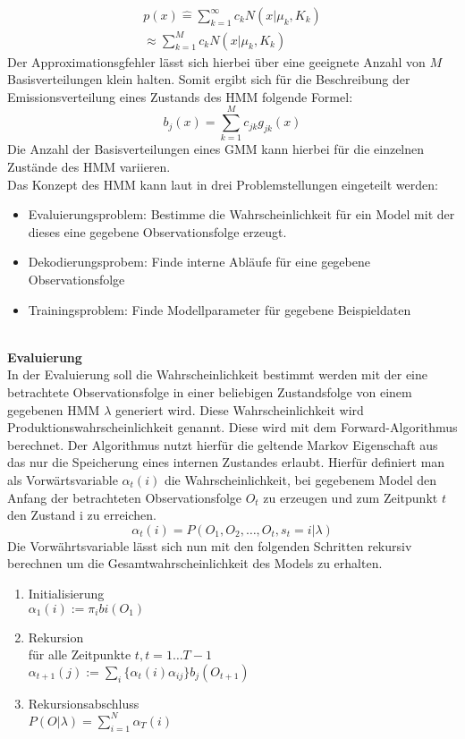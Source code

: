 \begin{multline}
p(x) \hat{=} \sum_{k=1}^\infty c_{k} N(x|\mu_{k},K_{k})\\
\approx \sum_{k=1}^M c_{k} N(x|\mu_{k},K_{k})  
\end{multline}
Der Approximationsgfehler lässt sich hierbei über eine geeignete Anzahl von
\(M\) Basisverteilungen klein halten. Somit ergibt sich für die Beschreibung der
Emissionsverteilung eines Zustands des \acl{HMM} folgende Formel:
\begin{equation}
b_{j}(x) = \sum_{k=1}^M c_{jk}g_{jk}(x)
\end{equation}
Die Anzahl der Basisverteilungen eines \acl{GMM} kann hierbei für die einzelnen
Zustände des HMM variieren.\\

Das Konzept des \acl{HMM} kann laut \cite{rabiner} in drei Problemstellungen eingeteilt werden:
\begin{itemize}
  \item Evaluierungsproblem: Bestimme die Wahrscheinlichkeit für ein Model mit
  der dieses eine gegebene Observationsfolge erzeugt.
  \item Dekodierungsprobem: Finde interne Abläufe für eine gegebene Observationsfolge
  \item Trainingsproblem: Finde Modellparameter für gegebene Beispieldaten
\end{itemize}
\\
\textbf{Evaluierung} \\
In der Evaluierung soll die Wahrscheinlichkeit bestimmt werden mit der eine
betrachtete Observationsfolge in einer beliebigen Zustandsfolge von einem
gegebenen \acl{HMM} \(\lambda\) generiert wird. Diese Wahrscheinlichkeit wird
Produktionswahrscheinlichkeit genannt. Diese wird mit dem Forward-Algorithmus
berechnet. Der Algorithmus nutzt hierfür die geltende Markov Eigenschaft
aus das nur die Speicherung eines internen Zustandes erlaubt. Hierfür definiert
man als Vorwärtsvariable \(\alpha_{t}(i)\) die Wahrscheinlichkeit, bei
gegebenem Model \lampda den Anfang der betrachteten Observationsfolge \(O_{t}\)
zu erzeugen und zum Zeitpunkt \(t\) den Zustand i zu erreichen.
\begin{equation}
\alpha_{t}(i) = P(O_{1},O_{2},\ldots,O_{t},s_{t}=i|\lambda)
\end{equation}
Die Vorwährtsvariable lässt sich nun mit den folgenden Schritten rekursiv
berechnen um die Gesamtwahrscheinlichkeit des Models zu erhalten.
\begin{enumerate}
  \item Initialisierung\\
		$\alpha_{1}(i) := \pi_{i}b{i}(O_{1})$
  \item Rekursion\\
	für alle Zeitpunkte \(t, t=1 \ldots T-1\)\\
	\(\alpha_{t+1}(j) :=
	\sum\limits_{i}\{\alpha_{t}(i)\alpha_{ij}\}b_{j}(O_{t+1})\)
  \item Rekursionsabschluss\\
  	\(P(O|\lambda) = \sum\limits_{i=1}^N \alpha_{T}(i)\)
\end{enumerate}


